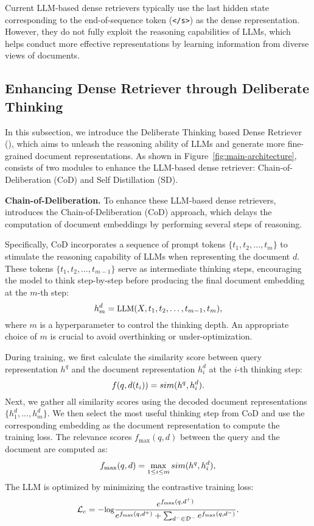 Current LLM-based dense retrievers typically use the last hidden state corresponding to the end-of-sequence token (\texttt{</s>}) as the dense representation. However, they do not fully exploit the reasoning capabilities of LLMs, which helps conduct more effective representations by learning information from diverse views of documents.

\subsection{Enhancing Dense Retriever through Deliberate Thinking}
\label{method:method} 
In this subsection, we introduce the Deliberate Thinking based Dense Retriever (\method{}), which aims to unleash the reasoning ability of LLMs and generate more fine-grained document representations. As shown in Figure~\ref{fig:main-architecture}, \method{} consists of two modules to enhance the LLM-based dense retriever: Chain-of-Deliberation (CoD) and Self Distillation (SD).

\textbf{Chain-of-Deliberation.}
To enhance these LLM-based dense retrievers, \method{} introduces the Chain-of-Deliberation (CoD) approach, which delays the computation of document embeddings by performing several steps of reasoning.

Specifically, CoD incorporates a sequence of prompt tokens $\{t_1, t_2, \dots, t_m \}$ to stimulate the reasoning capability of LLMs when representing the document $d$. These tokens $\{t_1, t_2, \dots, t_{m-1} \}$ serve as intermediate thinking steps, encouraging the model to think step-by-step before producing the final document embedding at the $m$-th step:
\begin{equation}\small
\label{eq:cod}
h_{m}^d = \text{LLM}( X,t_1,t_2, \dots, t_{m-1}, t_m),
\end{equation}
where $m$ is a hyperparameter to control the thinking depth. An appropriate choice of $m$ is crucial to avoid overthinking or under-optimization.


During training, we first calculate the similarity score between query representation $h^q$ and the document representation $h^d_i$ at the $i$-th thinking step:
\begin{equation}\small
f(q, d(t_i)) = sim (h^q, h^d_i).
\end{equation}
Next, we gather all similarity scores using the decoded document representations $\{h^d_1, ..., h^d_m\}$. We then select the most useful thinking step from CoD and use the corresponding embedding as the document representation to compute the training loss. The relevance scores $f_\text{max}(q, d)$ between the query and the document are computed as:
\begin{equation}\small 
f_\text{max}(q, d) = \max_{1 \leq i \leq m} sim(h^q, h^d_i),
\label{eq:relevance}
\end{equation} 
The LLM is optimized by minimizing the contrastive training loss:
\begin{equation}\small
\mathcal{L}_c=-\text{log}\frac{e^{f_\text{max}(q, {d^+})}}{e^{f_\text{max}(q, {d^+})}+ \sum_{d^-\in \mathcal{D}^-}e^{f_\text{max}(q, {d^-})}}.
\end{equation} 


